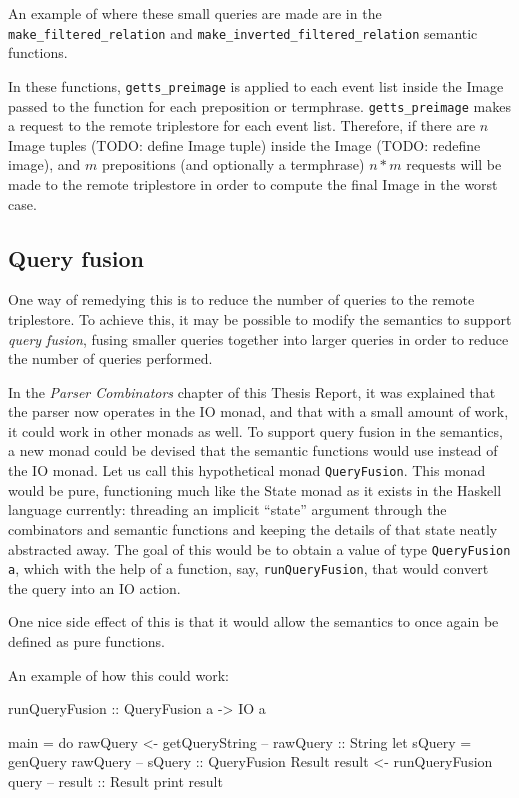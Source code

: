 \documentclass[../main.tex]{subfiles}
\begin{document}
An example of where these small queries are made are in the \texttt{make\_filtered\_relation} and \texttt{make\_inverted\_filtered\_relation} semantic functions.

In these functions, \texttt{getts\_preimage} is applied to each event list inside the Image passed to the function for each preposition or termphrase.  \texttt{getts\_preimage} makes a request to the remote triplestore for each event list.  Therefore, if there are $n$ Image tuples (TODO: define Image tuple) inside the Image (TODO: redefine image), and
$m$ prepositions (and optionally a termphrase) $n*m$ requests will be made to the remote triplestore in order to compute the final Image in the worst case.

\subsection{Query fusion}

One way of remedying this is to reduce the number of queries to the remote triplestore.  To achieve this, it may be possible to modify the semantics to
support {\em query fusion}, fusing smaller queries together into larger queries in order to reduce the number of queries performed.

In the {\em Parser Combinators} chapter of this Thesis Report, it was explained that the parser now operates in the IO monad, and that with a small amount of work, it could
work in other monads as well.  To support query fusion in the semantics, a new monad could be devised that the semantic functions would use instead of the IO monad.  Let us
call this hypothetical monad \texttt{QueryFusion}.  This monad would be pure, functioning much like the State monad as it exists in the Haskell language currently: threading
an implicit ``state'' argument through the combinators and semantic functions and keeping the details of that state neatly abstracted away.  The goal of this would be
to obtain a value of type \texttt{QueryFusion a}, which with the help of a function, say, \texttt{runQueryFusion}, that would convert the query into an IO action.

One nice side effect of this is that it would allow the semantics to once again be defined as pure functions.

An example of how this could work:

\begin{code}
	
runQueryFusion :: QueryFusion a -> IO a

main = do
	rawQuery <- getQueryString      -- rawQuery :: String
	let sQuery = genQuery rawQuery  -- sQuery   :: QueryFusion Result
	result <- runQueryFusion query  -- result   :: Result
	print result

\end{code}
\end{document}
